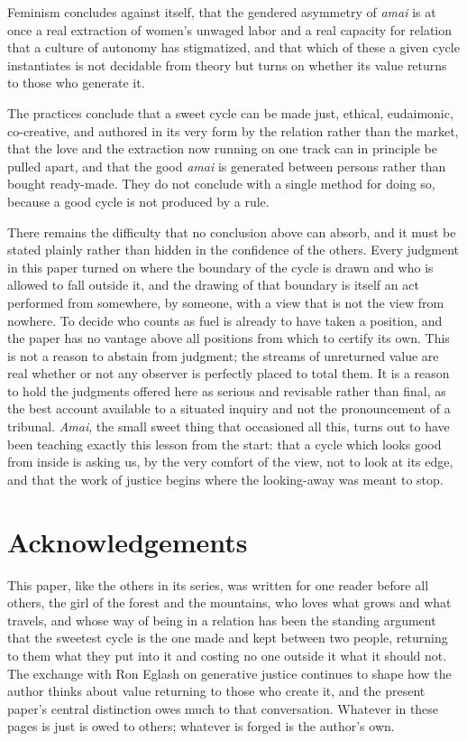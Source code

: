 Feminism concludes against itself, that the gendered asymmetry of \textit{amai} is at once a real extraction of women's unwaged labor and a real capacity for relation that a culture of autonomy has stigmatized, and that which of these a given cycle instantiates is not decidable from theory but turns on whether its value returns to those who generate it.

The practices conclude that a sweet cycle can be made just, ethical, eudaimonic, co-creative, and authored in its very form by the relation rather than the market, that the love and the extraction now running on one track can in principle be pulled apart, and that the good \textit{amai} is generated between persons rather than bought ready-made. They do not conclude with a single method for doing so, because a good cycle is not produced by a rule.

There remains the difficulty that no conclusion above can absorb, and it must be stated plainly rather than hidden in the confidence of the others. Every judgment in this paper turned on where the boundary of the cycle is drawn and who is allowed to fall outside it, and the drawing of that boundary is itself an act performed from somewhere, by someone, with a view that is not the view from nowhere. To decide who counts as fuel is already to have taken a position, and the paper has no vantage above all positions from which to certify its own. This is not a reason to abstain from judgment; the streams of unreturned value are real whether or not any observer is perfectly placed to total them. It is a reason to hold the judgments offered here as serious and revisable rather than final, as the best account available to a situated inquiry and not the pronouncement of a tribunal. \textit{Amai}, the small sweet thing that occasioned all this, turns out to have been teaching exactly this lesson from the start: that a cycle which looks good from inside is asking us, by the very comfort of the view, not to look at its edge, and that the work of justice begins where the looking-away was meant to stop.

\goldrule

\section*{Acknowledgements}
This paper, like the others in its series, was written for one reader before all others, the girl of the forest and the mountains, who loves what grows and what travels, and whose way of being in a relation has been the standing argument that the sweetest cycle is the one made and kept between two people, returning to them what they put into it and costing no one outside it what it should not. The exchange with Ron Eglash on generative justice continues to shape how the author thinks about value returning to those who create it, and the present paper's central distinction owes much to that conversation. Whatever in these pages is just is owed to others; whatever is forged is the author's own.

